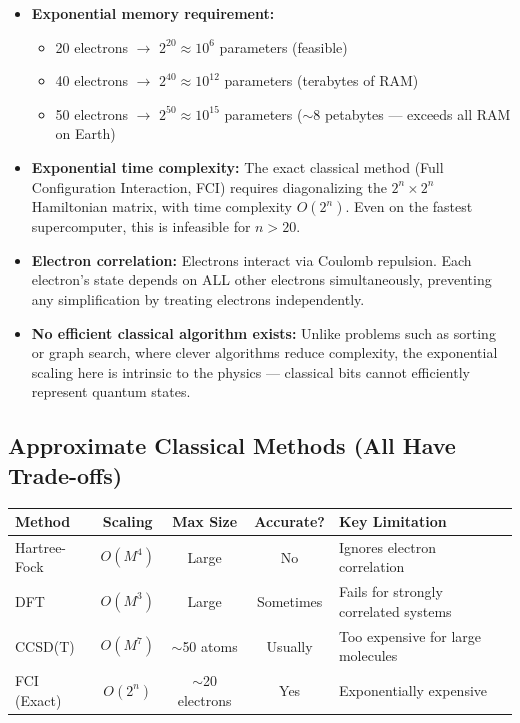 \documentclass[11pt]{article}
\begin{document}
\begin{itemize}
    \item \textbf{Exponential memory requirement:}
    \begin{itemize}
        \item 20 electrons $\rightarrow$ $2^{20} \approx 10^6$ parameters (feasible)
        \item 40 electrons $\rightarrow$ $2^{40} \approx 10^{12}$ parameters (terabytes of RAM)
        \item 50 electrons $\rightarrow$ $2^{50} \approx 10^{15}$ parameters ($\sim$8 petabytes --- exceeds all RAM on Earth)
    \end{itemize}
    
    \item \textbf{Exponential time complexity:} The exact classical method (Full Configuration Interaction, FCI) requires diagonalizing the $2^n \times 2^n$ Hamiltonian matrix, with time complexity $O(2^n)$. Even on the fastest supercomputer, this is infeasible for $n > 20$.
    
    \item \textbf{Electron correlation:} Electrons interact via Coulomb repulsion. Each electron's state depends on ALL other electrons simultaneously, preventing any simplification by treating electrons independently.
    
    \item \textbf{No efficient classical algorithm exists:} Unlike problems such as sorting or graph search, where clever algorithms reduce complexity, the exponential scaling here is intrinsic to the physics --- classical bits cannot efficiently represent quantum states.
\end{itemize}

\subsection*{Approximate Classical Methods (All Have Trade-offs)}

\begin{center}
\begin{tabular}{|l|c|c|c|l|}
\hline
\textbf{Method} & \textbf{Scaling} & \textbf{Max Size} & \textbf{Accurate?} & \textbf{Key Limitation} \\
\hline
Hartree-Fock & $O(M^4)$ & Large & No & Ignores electron correlation \\
DFT & $O(M^3)$ & Large & Sometimes & Fails for strongly correlated systems \\
CCSD(T) & $O(M^7)$ & $\sim$50 atoms & Usually & Too expensive for large molecules \\
FCI (Exact) & $O(2^n)$ & $\sim$20 electrons & Yes & Exponentially expensive \\
\hline
\end{tabular}
\end{center}
\end{document}

